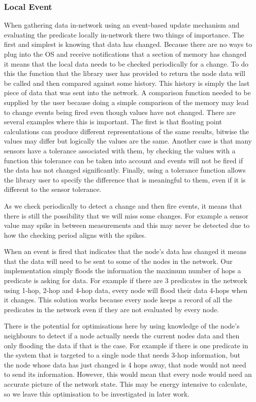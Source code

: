 \subsubsection{Local Event}

When gathering data in-network using an event-based update mechanism and evaluating the predicate locally in-network there two things of importance. The first and simplest is knowing that data has changed. Because there are no ways to plug into the OS and receive notifications that a section of memory has changed it means that the local data needs to be checked periodically for a change. To do this the function that the library user has provided to return the node data will be called and then compared against some history. This history is simply the last piece of data that was sent into the network. A comparison function needed to be supplied by the user because doing a simple comparison of the memory may lead to change events being fired even though values have not changed. There are several examples where this is important. The first is that floating point calculations can produce different representations of the same results, bitwise the values may differ but logically the values are the same. Another case is that many sensors have a tolerance associated with them, by checking the values with a function this tolerance can be taken into account and events will not be fired if the data has not changed significantly. Finally, using a tolerance function allows the library user to specify the difference that is meaningful to them, even if it is different to the sensor tolerance.

As we check periodically to detect a change and then fire events, it means that there is still the possibility that we will miss some changes. For example a sensor value may spike in between measurements and this may never be detected due to how the checking period aligns with the spikes.

When an event is fired that indicates that the node's data has changed it means that the data will need to be sent to some of the nodes in the network. Our implementation simply floods the information the maximum number of hops a predicate is asking for data. For example if there are 3 predicates in the network using 1-hop, 2-hop and 4-hop data, every node will flood their data 4-hops when it changes. This solution works because every node keeps a record of all the predicates in the network even if they are not evaluated by every node.

There is the potential for optimisations here by using knowledge of the node's neighbours to detect if a node actually needs the current nodes data and then only flooding the data if that is the case. For example if there is one predicate in the system that is targeted to a single node that needs 3-hop information, but the node whose data has just changed is 4 hops away, that node would not need to send its information. However, this would mean that every node would need an accurate picture of the network state. This may be energy intensive to calculate, so we leave this optimisation to be investigated in later work.

